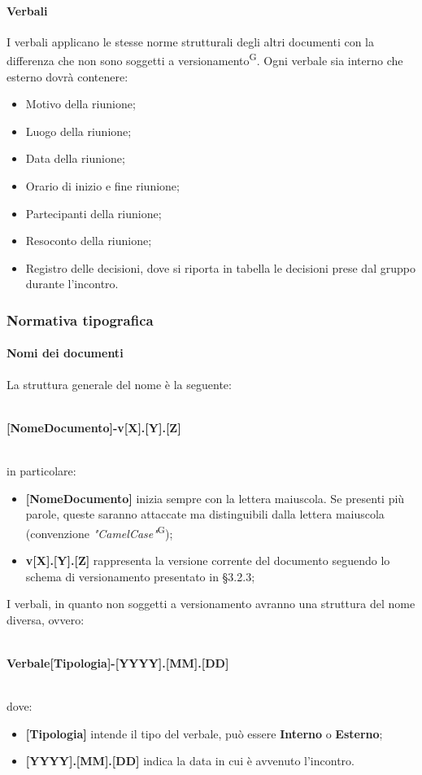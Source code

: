 \paragraph{Verbali}
I verbali applicano le stesse norme strutturali degli altri documenti con la differenza che non sono soggetti a versionamento\textsuperscript{G}. Ogni verbale sia interno che esterno dovrà contenere:
\begin{itemize}
\item Motivo della riunione;
\item Luogo della riunione;
\item Data della riunione;
\item Orario di inizio e fine riunione;
\item Partecipanti della riunione;
\item Resoconto della riunione;
\item Registro delle decisioni, dove si riporta in tabella le decisioni prese dal gruppo durante l’incontro.
\end{itemize}  		

\subsubsection{Normativa tipografica}
\paragraph{Nomi dei documenti}
La struttura generale del nome è la seguente: \\ \\
\centerline{\textbf{[NomeDocumento]-v[X].[Y].[Z]}}\\
in particolare:
\begin{itemize}
\item \textbf{[NomeDocumento]} inizia sempre con la lettera maiuscola. Se presenti più parole, queste saranno attaccate ma distinguibili dalla lettera maiuscola (convenzione \textit{"CamelCase"}\textsuperscript{G});
\item \textbf{v[X].[Y].[Z]} rappresenta la versione corrente del documento seguendo lo schema di versionamento presentato in §3.2.3;
\end{itemize}
I verbali, in quanto non soggetti a versionamento avranno una struttura del nome diversa, ovvero:\\ \\
\centerline{\textbf{Verbale[Tipologia]-[YYYY].[MM].[DD]}} \\
dove:
\begin{itemize}
\item \textbf{[Tipologia]} intende il tipo del verbale, può essere \textbf{Interno} o \textbf{Esterno};
\item \textbf{[YYYY].[MM].[DD]} indica la data in cui è avvenuto l'incontro.
\end{itemize}


